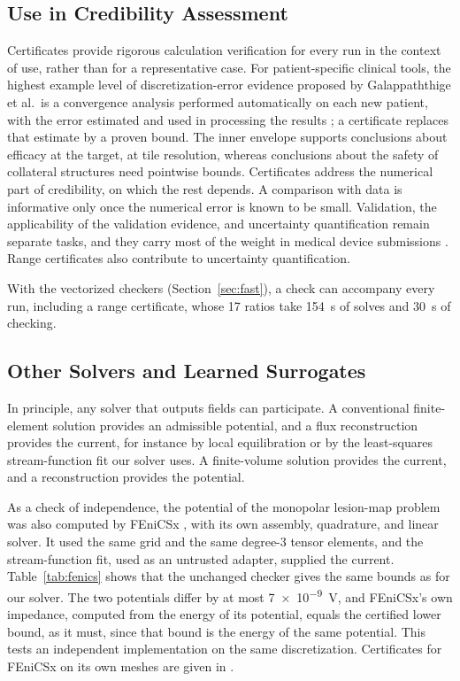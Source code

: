 \documentclass[11pt]{article}
\begin{document}
\subsection{Use in Credibility Assessment} Certificates provide rigorous
calculation verification for every run in the context of use, rather than for a
representative case. For patient-specific clinical tools, the highest example
level of discretization-error evidence proposed by Galappaththige et al.\ is a
convergence analysis performed automatically on each new patient, with the error
estimated and used in processing the results \cite{galappaththige2022}; a
certificate replaces that estimate by a proven bound. The inner envelope supports
conclusions about efficacy at the target, at tile resolution, whereas conclusions
about the safety of collateral structures need pointwise bounds.
Certificates address the numerical part of credibility, on which the rest
depends. A comparison with data is informative only once the numerical error is
known to be small. Validation, the applicability of the validation evidence, and
uncertainty quantification remain separate tasks, and they carry most of the
weight in medical device submissions
\cite{pathmanathan2017,viceconti2021,galappaththige2022}. Range
certificates also contribute to uncertainty quantification.

With the vectorized checkers (Section~\ref{sec:fast}), a check can accompany every run,
including a range certificate, whose 17 ratios take \SI{154}{s} of solves and \SI{30}{s}
of checking.

\subsection{Other Solvers and Learned Surrogates}\label{sec:others} In principle, any solver that
outputs fields can participate. A conventional finite-element solution provides
an admissible potential, and a flux reconstruction provides the current, for
instance by local equilibration \cite{braess2009,ernvohralik2015} or by the
least-squares stream-function fit our solver uses. A finite-volume solution
provides the current, and a reconstruction provides the potential.

As a check of independence, the potential of the monopolar lesion-map problem
was also computed by FEniCSx \cite{baratta2023}, with its own assembly,
quadrature, and linear solver. It used the same grid and the same degree-3
tensor elements, and the stream-function fit, used as an untrusted adapter,
supplied the current. Table~\ref{tab:fenics} shows that the unchanged checker
gives the same bounds as for our solver. The two potentials differ by at most
\SI{7e-9}{V}, and FEniCSx's own impedance, computed from the energy of its potential, equals
the certified lower bound, as it must, since that bound is the energy of the same
potential. This tests an independent implementation on the same
discretization. Certificates for FEniCSx on its own meshes are given in
\cite{dovelos2026b}.
\end{document}
